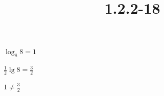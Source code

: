 \documentclass{article}
\title{1.2.2-18}
\begin{document}
\maketitle

\( \log_8{8} = 1 \)

\( \frac{1}{2}\lg{8} = \frac{3}{2} \)

\( 1 \neq \frac{3}{2} \)
\end{document}
